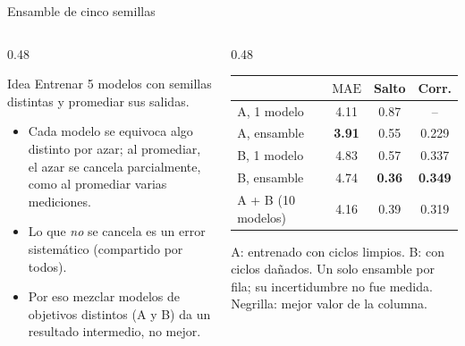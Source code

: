 \documentclass[aspectratio=169,10pt,t]{beamer}
\newcommand{\mae}{\ensuremath{\mathrm{MAE}}}
\begin{document}
\begin{frame}{Ensamble de cinco semillas}
\begin{columns}[T]
\begin{column}{0.48\textwidth}
\begin{block}{Idea}
Entrenar 5 modelos con semillas distintas y \alert{promediar sus salidas}.
\end{block}
\begin{itemize}\setlength{\itemsep}{4pt}\small
\item Cada modelo se equivoca algo distinto por azar; al promediar, el azar se cancela parcialmente, como al promediar varias mediciones.
\item Lo que \emph{no} se cancela es un error sistemático (compartido por todos).
\item Por eso mezclar modelos de objetivos distintos (A y B) da un resultado intermedio, no mejor.
\end{itemize}
\end{column}
\begin{column}{0.48\textwidth}
\small
\begin{tabular}{lccc}
\toprule
 & \textbf{\mae{}} & \textbf{Salto} & \textbf{Corr.}\\
\midrule
A, 1 modelo & 4.11 & 0.87 & --\\
\rowcolor{verdec}A, ensamble & \textbf{3.91} & 0.55 & 0.229\\
B, 1 modelo & 4.83 & 0.57 & 0.337\\
\rowcolor{verdec}B, ensamble & 4.74 & \textbf{0.36} & \textbf{0.349}\\
A + B (10 modelos) & 4.16 & 0.39 & 0.319\\
\bottomrule
\end{tabular}

\vspace{4pt}
{\scriptsize A: entrenado con ciclos limpios. B: con ciclos dañados. Un solo ensamble por fila; su incertidumbre no fue medida. Negrilla: mejor valor de la columna.}
\end{column}
\end{columns}
\end{frame}
\end{document}
